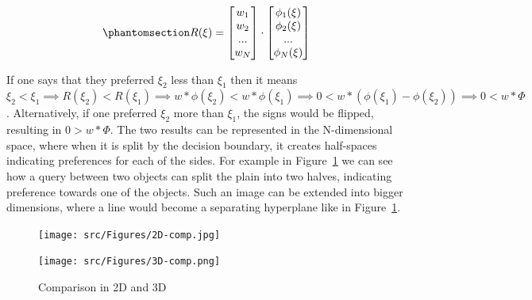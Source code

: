 \documentclass[
  letterpaper,
  numbers=noenddot,
  DIV=11]{scrreprt}
\theoremstyle{definition}
\theoremstyle{plain}
\theoremstyle{plain}
\theoremstyle{remark}
\begin{document}
\begin{equation}\phantomsection\label{eq-reward_eq}{R(\xi) = \begin{bmatrix} w_1 \\ w_2 \\ ... \\ w_N \end{bmatrix} \cdot \begin{bmatrix} \phi_1(\xi) \\ \phi_2(\xi) \\ ... \\ \phi_N(\xi) \end{bmatrix}}\end{equation}

If one says that they preferred \(\xi_2\) less than \(\xi_1\) then it
means
\(\xi_2 < \xi_1 \implies R(\xi_2) < R(\xi_1) \implies w * \phi(\xi_2) < w * \phi(\xi_1) \implies 0 < w * (\phi(\xi_1) - \phi(\xi_2)) \implies 0 < w * \Phi\).
Alternatively, if one preferred \(\xi_2\) more than \(\xi_1\), the signs
would be flipped, resulting in \(0 > w * \Phi\). The two results can be
represented in the N-dimensional space, where when it is split by the
decision boundary, it creates half-spaces indicating preferences for
each of the sides. For example in Figure~\ref{fig-2dcomp} we can see how
a query between two objects can split the plain into two halves,
indicating preference towards one of the objects. Such an image can be
extended into bigger dimensions, where a line would become a separating
hyperplane like in Figure~\ref{fig-2dcomp}.

\begin{figure}

\begin{minipage}{0.50\linewidth}

\texttt{[image: src/Figures/2D-comp.jpg]}

\end{minipage}%
%
\begin{minipage}{0.50\linewidth}

\texttt{[image: src/Figures/3D-comp.png]}

\end{minipage}%

\caption{\label{fig-2dcomp}Comparison in 2D and 3D}

\end{figure}%
\end{document}
